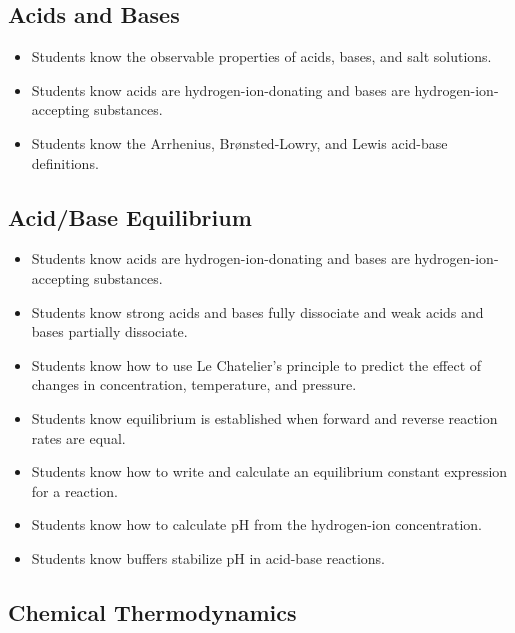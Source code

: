 \documentclass[12pt]{article}
\begin{document}
\subsection{Acids and Bases}

\begin{itemize}
    \item Students know the observable properties of acids, bases, and salt solutions.
    \item Students know acids are hydrogen-ion-donating and bases are hydrogen-ion-accepting substances.
    \item Students know the Arrhenius, Brønsted-Lowry, and Lewis acid-base definitions.
\end{itemize}


\subsection{Acid/Base Equilibrium}

\begin{itemize}
    \item Students know acids are hydrogen-ion-donating and bases are hydrogen-ion-accepting substances.
    \item Students know strong acids and bases fully dissociate and weak acids and bases partially dissociate.
    \item Students know how to use Le Chatelier's principle to predict the effect of changes in concentration, temperature, and pressure.
    \item Students know equilibrium is established when forward and reverse reaction rates are equal.
    \item Students know how to write and calculate an equilibrium constant expression for a reaction.
    \item Students know how to calculate pH from the hydrogen-ion concentration.
    \item Students know buffers stabilize pH in acid-base reactions.
\end{itemize}

\subsection{Chemical Thermodynamics}
\end{document}
